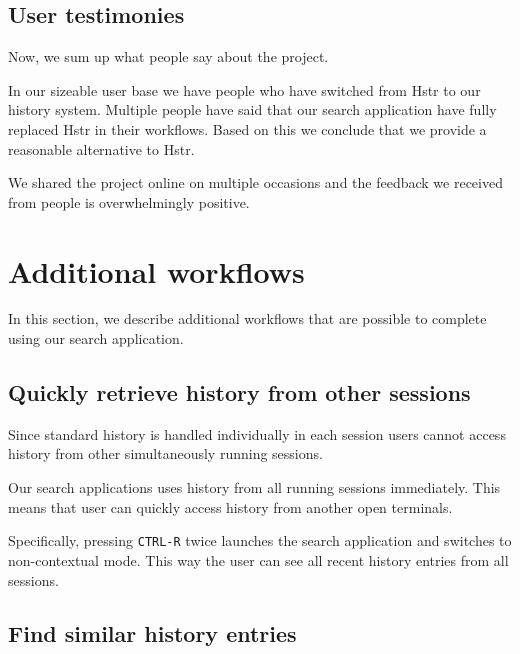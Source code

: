 

\subsection{User testimonies}

Now, we sum up what people say about the project. 

In our sizeable user base we have people who have switched from Hstr to our history system. Multiple people have said that our search application have fully replaced Hstr in their workflows. Based on this we conclude that we provide a reasonable alternative to Hstr.

We shared the project online on multiple occasions and the feedback we received from people is overwhelmingly positive.\cite{resh-feedback}

\section{Additional workflows}

In this section, we describe additional workflows that are possible to complete using our search application. 

\subsection{Quickly retrieve history from other sessions}

Since standard history is handled individually in each session users cannot access history from other simultaneously running sessions. 

Our search applications uses history from all running sessions immediately. This means that user can quickly access history from another open terminals. 

Specifically, pressing \verb|CTRL-R| twice launches the search application and switches to non-contextual mode. This way the user can see all recent history entries from all sessions.

\subsection{Find similar history entries}

